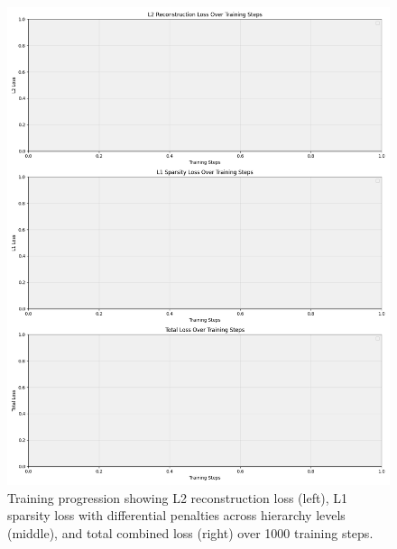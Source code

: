 \begin{figure}[t]
\centering
\includegraphics[width=\linewidth]{training_curves.png}
\caption{Training progression showing L2 reconstruction loss (left), L1 sparsity loss with differential penalties across hierarchy levels (middle), and total combined loss (right) over 1000 training steps.}
\label{fig:training_curves}
\end{figure}
